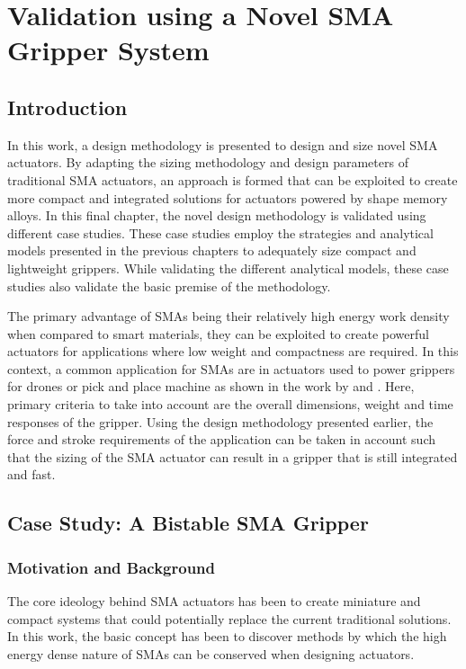 
\chapter{Validation using a Novel SMA Gripper System}\label{chap:case-study}
\section{Introduction}
In this work, a design methodology is presented to design and size novel SMA actuators. By adapting the sizing methodology and design parameters of traditional SMA actuators, an approach is formed that can be exploited to create more compact and integrated solutions for actuators powered by shape memory alloys. In this final chapter, the novel design methodology is validated using different case studies. These case studies employ the strategies and analytical models presented in the previous chapters to adequately size compact and lightweight grippers. While validating the different analytical models, these case studies also validate the basic premise of the methodology.

The primary advantage of SMAs being their relatively high energy work density when compared to smart materials, they can be exploited to create powerful actuators for applications where low weight and compactness are required. In this context, a common application for SMAs are in actuators used to power grippers for drones or pick and place machine as shown in the work by \todocite and \todocite. Here, primary criteria to take into account are the overall dimensions, weight and time responses of the gripper. Using the design methodology presented earlier, the force and stroke requirements of the application can be taken in account such that the sizing of the SMA actuator can result in a gripper that is still integrated and fast.

\section{Case Study: A Bistable SMA Gripper}\label{sec:smabb-gripper}
\subsection{Motivation and Background}
The core ideology behind SMA actuators has been to create miniature and compact systems that could potentially replace the current traditional solutions. In this work, the basic concept has been to discover methods by which the high energy dense nature of SMAs can be conserved when designing actuators.


